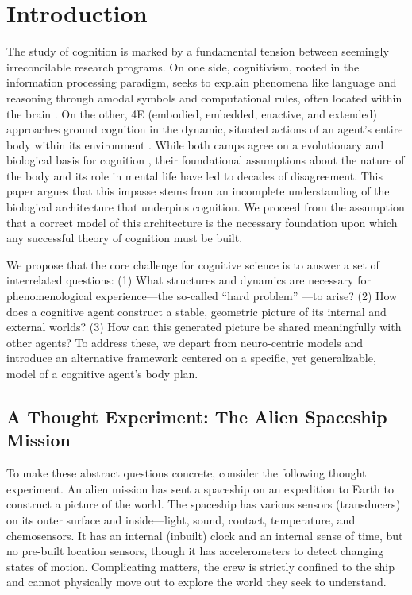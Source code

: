 \section{Introduction}
\label{sec:introduction}
The study of cognition is marked by a fundamental tension between seemingly irreconcilable research programs. On one side, cognitivism, rooted in the information processing paradigm, seeks to explain phenomena like language and reasoning through amodal symbols and computational rules, often located within the brain \cite{chomsky1965aspects, fodor_modularity_1983}. On the other, 4E (embodied, embedded, enactive, and extended) approaches ground cognition in the dynamic, situated actions of an agent's entire body within its environment \cite{varela1991embodied,  maturana1991autopoiesis, noe_action_2004}. While both camps agree on a evolutionary and biological basis for cognition \cite{chomsky1965aspects, varela1991embodied}, their foundational assumptions about the nature of the body and its role in mental life have led to decades of disagreement. This paper argues that this impasse stems from an incomplete understanding of the biological architecture that underpins cognition. We proceed from the assumption that a correct model of this architecture is the necessary foundation upon which any successful theory of cognition must be built.

We propose that the core challenge for cognitive science is to answer a set of interrelated questions: (1) What structures and dynamics are necessary for phenomenological experience—the so-called ``hard problem'' \cite{chalmers1995facing}—to arise? (2) How does a cognitive agent construct a stable, geometric picture of its internal and external worlds? (3) How can this generated picture be shared meaningfully with other agents? To address these, we depart from neuro-centric models and introduce an alternative framework centered on a specific, yet generalizable, model of a cognitive agent's body plan.

\subsection{A Thought Experiment: The Alien Spaceship Mission}
To make these abstract questions concrete, consider the following thought experiment. An alien mission has sent a spaceship on an expedition to Earth to construct a picture of the world. The spaceship has various sensors (transducers) on its outer surface and inside—light, sound, contact, temperature, and chemosensors. It has an internal (inbuilt) clock and an internal sense of time, but no pre-built location sensors, though it has accelerometers to detect changing states of motion. Complicating matters, the crew is strictly confined to the ship and cannot physically move out to explore the world they seek to understand.


